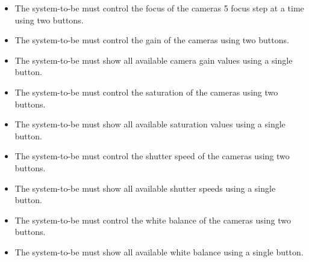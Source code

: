 \begin{itemize}
	\item The system-to-be must control the focus of the cameras 5 focus step at a time using two buttons.
	\item The system-to-be must control the gain of the cameras using two buttons.
	\item The system-to-be must show all available camera gain values using a single button.
	\item The system-to-be must control the saturation of the cameras using two buttons.
	\item The system-to-be must show all available saturation values using a single button.
	\item The system-to-be must control the shutter speed of the cameras using two buttons.
	\item The system-to-be must show all available shutter speeds using a single button.
	\item The system-to-be must control the white balance of the cameras using two buttons.
	\item The system-to-be must show all available white balance using a single button.
\end{itemize}



